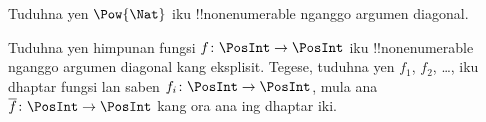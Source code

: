 \documentclass[../../../include/open-logic-section]{subfiles}
\begin{document}
\begin{prob}
Tuduhna yen $\Pow{\Nat}$ iku !!{nonenumerable} nganggo argumen diagonal.
\end{prob}

\begin{prob}\label{sfr:siz:nen:prob:f-posint}
Tuduhna yen himpunan fungsi $f \colon \PosInt \to \PosInt$ iku
!!{nonenumerable} nganggo argumen diagonal kang eksplisit. Tegese,
tuduhna yen $f_1$, $f_2$, \dots, iku dhaptar fungsi lan saben $f_i\colon
\PosInt \to \PosInt$, mula ana $\overline{f}\colon \PosInt \to
\PosInt$ kang ora ana ing dhaptar iki.
\end{prob}
\end{document}
